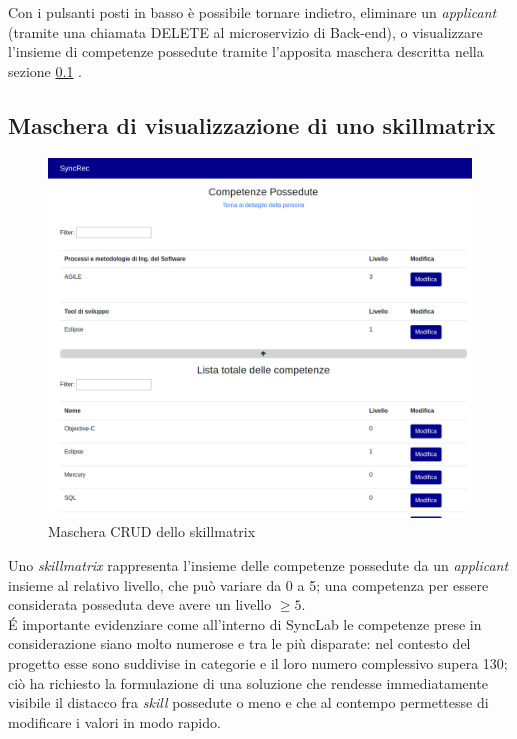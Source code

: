 Con i pulsanti posti in basso è possibile tornare indietro, eliminare un \textit{applicant} (tramite una chiamata DELETE al microservizio di Back-end), o visualizzare l'insieme di competenze possedute tramite l'apposita maschera descritta nella sezione \ref{section:skillmatrix}
\vspace{0.5em}.

\subsection{Maschera di visualizzazione di uno skillmatrix}\label{section:skillmatrix}
\begin{figure}[!h] 
	\centering 
	\includegraphics[width=1\columnwidth]{immagini/svil/skillmatrix} 
	\caption{Maschera CRUD dello skillmatrix}
	\label{figura:skillmatrix}
\end{figure}
Uno \textit{skillmatrix} rappresenta l'insieme delle competenze possedute da un \textit{applicant} insieme al relativo livello, che può variare da 0 a 5; una competenza per essere considerata posseduta deve avere un livello $\geq  5$.\\
\'E importante evidenziare come all'interno di SyncLab le competenze prese in considerazione siano molto numerose e tra le più disparate: nel contesto del progetto esse sono suddivise in categorie e il loro numero complessivo supera 130; ciò ha richiesto la formulazione di una soluzione che rendesse immediatamente visibile il distacco fra \textit{skill} possedute o meno e che al contempo  permettesse di modificare i valori in modo rapido.\\
